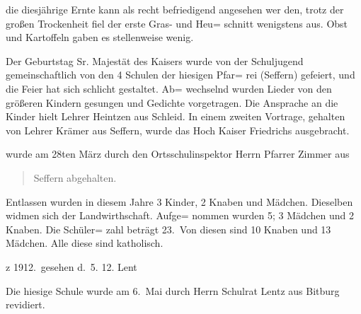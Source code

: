 

\pstart
die diesjährige Ernte kann als recht befriedigend angesehen wer\ohb
den, trotz der großen Trockenheit fiel der erste Gras- und Heu=\ob
schnitt wenigstens aus. Obst und Kartoffeln gaben es stellenweise\ob
wenig.

\pend
{}
\pstart

Der Geburtstag Sr. Majestät des Kaisers wurde von der Schuljugend\ob
gemeinschaftlich von den 4 Schulen der hiesigen Pfar=\ob
rei (Seffern) gefeiert, und die Feier hat sich schlicht gestaltet. Ab=\ob
wechselnd wurden Lieder von den größeren Kindern gesungen\ob
und Gedichte vorgetragen. Die Ansprache an die Kinder hielt\ob
Lehrer Heintzen aus Schleid. In einem zweiten Vortrage,\ob
gehalten von Lehrer Krämer aus Seffern, wurde das Hoch Kaiser\ob
Friedrichs ausgebracht.

\pend
{}
\pstart

wurde am 28ten März durch den Ortsschulinspektor Herrn Pfarrer Zimmer aus

\pend
\begin{verse}
Seffern abgehalten.
\end{verse}
\pstart

\pend
{}
\pstart

Entlassen wurden in diesem Jahre 3 Kinder, 2 Knaben und Mädchen. Dieselben widmen sich der Landwirthschaft. Aufge=\ob
nommen wurden 5; 3 Mädchen und 2 Knaben. Die Schüler=\ob
zahl beträgt 23.\ Von diesen sind 10 Knaben und 13 Mädchen.\ob
Alle diese sind katholisch.

%
z 1912.\ gesehen d.\ 5. 12.\ob
                       Lent

\pend
{}
\pstart

Die hiesige Schule wurde am 6.\ Mai durch Herrn Schulrat\ob
Lentz aus Bitburg revidiert.
\pend
